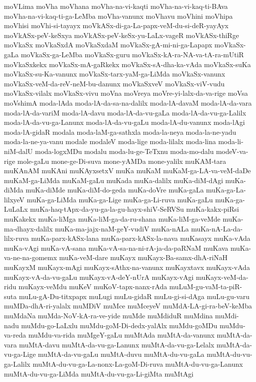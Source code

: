 {moVLima
moVha
moVhana
moVha-na-vi-kaqti
moVha-na-vi-kaq-ti-BAva
moVha-na-vi-kaq-ti-ga-LeMba
moVha-vanunx
moVhavu
moVhini
moVhipa
moVhisi
moVhi-si-tayayx
moVkASx-di-ga-La-papx-veM-du-si-deR-yayAyx
moVkASx-peV-keSxya
moVkASx-peV-keSx-yu-LaLx-vageR
moVkASx-thiRge
moVkaSx
moVkaSxdA
moVkaSxdaM
moVkaSx-gA-mi-ni-ga-Lapapx
moVkaSx-gaLa
moVkaSx-ga-LeMba
moVkaSx-guru
moVkaSx-kA-ra-NA-va-tA-ra-mUtiR
moVkaSxkekx
moVkaSx-mA-gaRkekx
moVkaSx-sA-dha-ka-vAda
moVkaSx-suKa
moVkaSx-su-Ka-vanunx
moVkaSx-tarx-yaM-ga-LiMda
moVkaSx-vanunx
moVkaSx-veM-da-reV-neM-bu-danunx
moVkaSxveV
moVkaSx-viV-vudu
moVkaSx-vilalx
moVkaSx-vivu
moVna
moVreya
moVre-yi-lalx-da-va-rige
moVsa
moVshimA
moda-lAda
moda-lA-da-sa-na-dalilx
moda-lA-davaM
moda-lA-da-vara
moda-lA-da-variM
moda-lA-davu
moda-lA-da-vu-gaLa
moda-lA-da-vu-ga-Lalilx
moda-lA-da-vu-ga-Lanunx
moda-lA-da-vu-gaLu
moda-lA-du-vanunx
moda-lAgi
moda-lA-gidaR
modala
moda-laM-ga-sathxla
moda-la-neya
moda-la-ne-yadu
moda-la-ne-ya-vanu
modale
modaleV
moda-lige
moda-lilalx
moda-lina
moda-li-niM-dalU
moda-logxMDu
modalu
moda-lu-ge-TeTxnu
moda-mo-dalu
modeV-va-rige
mole-gaLu
mone-ge-Di-suva
mone-yAMDa
mone-yalilx
muKAM-tara
muKAnAM
muKAni
muKAyxsetxV
muKa
muKaM
muKaM-ga-LA-va-veM-daDe
muKaM-ga-LiMda
muKaM-gaLu
muKada
muKa-dalilx
muKa-diM-dAgi
muKa-diMda
muKa-diMde
muKa-diM-do-geda
muKa-doVre
muKa-gaLa
muKa-ga-La-lilxyeV
muKa-ga-LiMda
muKa-ga-Lige
muKa-ga-Li-ruva
muKa-gaLu
muKa-ga-LuLaLx
muKa-haq-tApx-da-yu-ga-la-gu-hayx-shiV-SeRVSu
muKa-kakx-piRsi
muKakekx
muKa-liMga
muKa-liM-ga-da-ru-shana
muKa-liM-ga-veMde
muKa-ma-dhayx-dalilx
muKa-ma-jajx-naM-geY-vudiV
muKa-nALa
muKa-nA-La-da-lilx-ruva
muKa-parx-kASx-lana
muKa-parx-kASx-la-nava
muKasayx
muKa-vAda
muKa-vAgi
muKa-vA-sana
muKa-vA-sa-na-ni-rA-ja-da-paRNaM
muKava
muKa-va-ne-na-gomemx
muKa-veM-dare
muKayx
muKayx-Ba-samx-dhA-riNaH
muKayxM
muKayx-mAgi
muKayx-sAthx-na-vanunx
muKayxtavx
muKayx-vAda
muKayx-vA-da-vu-gaLu
muKayx-vA-deY-nUrA
muKayx-vAgi
muKayx-veM-da-ridu
muKayx-veMdu
muKeV
muKoV-tapx-nanx-rAda
muLuM-gu-vaM-ta-piR-suta
muLu-gA-Du-titxpapx
muLugi
muLu-gidaR
muLu-gi-si-dAga
muLu-gu-varu
muMDa-dhA-ri-yalalx
muMDiV
muMce
muMceyeV
muMdA-LA-gi-ra-beV-keMba
muMdaNa
muMda-NoV-kA-ra-ve-yide
muMde
muMdiduR
muMdina
muMdi-nadu
muMdu-go-LaLxlu
muMdu-goM-Di-dedx-yalAlx
muMdu-goMDu
muMdu-va-reda
muMdu-va-rida
muMgeY-gaLu
muMtAda
muMtA-da-vanunx
muMtA-da-vara
muMtA-davu
muMtA-da-vu-ga-Lanunx
muMtA-da-vu-ga-Lelalx
muMtA-da-vu-ga-Lige
muMtA-da-vu-gaLu
muMtA-duvu
muMtA-du-vu-gaLa
muMtA-du-vu-ga-Lalilx
muMtA-du-vu-ga-La-nonx-La-goM-Di-ruva
muMtA-du-vu-ga-Lanunx
muMtA-du-vu-ga-LiMda
muMtA-du-vu-ga-Li-giMta
muMtAgi
}
